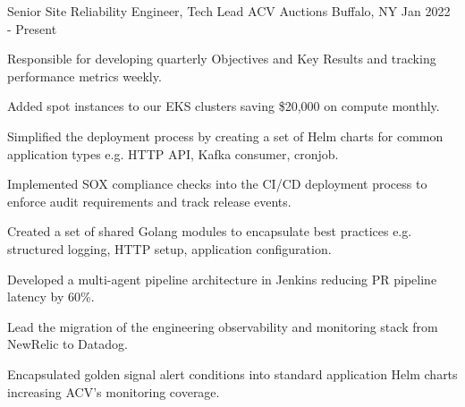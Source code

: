 
\begin{cventries}

  \cventry
    {Senior Site Reliability Engineer, Tech Lead} %
    {ACV Auctions} %
    {Buffalo, NY} %
    {Jan 2022 - Present} %
    {
      \begin{cvitems} %
        \item {Responsible for developing quarterly Objectives and Key Results and tracking performance metrics weekly.}
        \item {Added spot instances to our EKS clusters saving \$20,000 on compute monthly.}
        \item {Simplified the deployment process by creating a set of Helm charts for common application types e.g. HTTP API, Kafka consumer, cronjob.}
        \item {Implemented SOX compliance checks into the CI/CD deployment process to enforce audit requirements and track release events.}
        \item {Created a set of shared Golang modules to encapsulate best practices e.g. structured logging, HTTP setup, application configuration.}
        \item {Developed a multi-agent pipeline architecture in Jenkins reducing PR pipeline latency by 60\%.}
        \item {Lead the migration of the engineering observability and monitoring stack from NewRelic to Datadog.}
        \item {Encapsulated golden signal alert conditions into standard application Helm charts increasing ACV's monitoring coverage.}
      \end{cvitems}
    }


\end{cventries}
